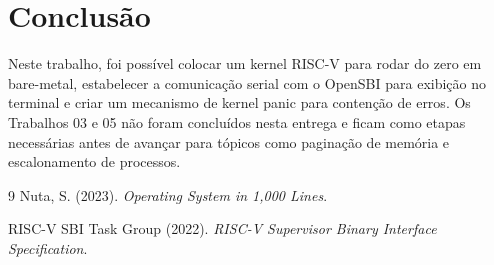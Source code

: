 \documentclass[12pt]{article}
\begin{document}
\section{Conclusão}

Neste trabalho, foi possível colocar um kernel RISC-V para rodar do zero em bare-metal, estabelecer a comunicação serial com o OpenSBI para exibição no terminal e criar um mecanismo de kernel panic para contenção de erros. Os Trabalhos 03 e 05 não foram concluídos nesta entrega e ficam como etapas necessárias antes de avançar para tópicos como paginação de memória e escalonamento de processos.

\begin{thebibliography}{9}
Nuta, S. (2023). \textit{Operating System in 1,000 Lines}.

RISC-V SBI Task Group (2022). \textit{RISC-V Supervisor Binary Interface Specification}.
\end{thebibliography}
\end{document}

